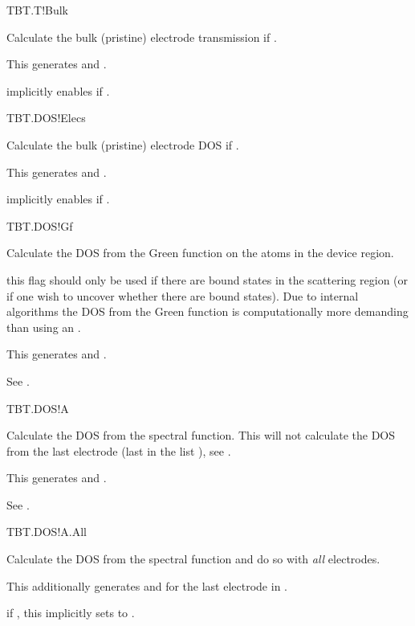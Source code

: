 \begin{fdflogicalF}{TBT.T!Bulk}

  Calculate the bulk (pristine) electrode transmission if
  \fdftrue.

  This generates  and .
  
  \note implicitly enables  if \fdftrue.

\end{fdflogicalF}

\begin{fdflogicalF}{TBT.DOS!Elecs}

  Calculate the bulk (pristine) electrode DOS if
  \fdftrue. 

  This generates  and .

  \note implicitly enables  if \fdftrue.

\end{fdflogicalF}


\begin{fdflogicalF}{TBT.DOS!Gf}

  Calculate the DOS from the Green function on the atoms in the device
  region. 

  \note this flag should only be used if there are bound states in the
  scattering region (or if one wish to uncover whether there are bound
  states). Due to internal algorithms the DOS from the Green function
  is computationally more demanding than using  an
  .

  This generates  and .

  See .

\end{fdflogicalF}

\begin{fdflogicalF}{TBT.DOS!A}

  Calculate the DOS from the spectral function. This will not
  calculate the DOS from the last electrode (last in the list
  ), see . 

  This generates  and .

  See .

\end{fdflogicalF}

\begin{fdflogicalF}{TBT.DOS!A.All}

  Calculate the DOS from the spectral function and do so with
  \emph{all} electrodes.

  This additionally generates  and
   for the last electrode in .

  \note if \fdftrue, this implicitly sets  to \fdftrue.

\end{fdflogicalF}

